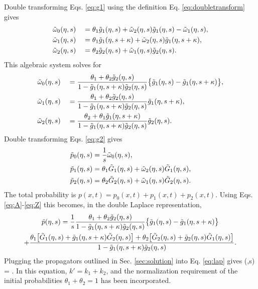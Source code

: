 Double transforming Eqs. \ref{eq:g1} using the definition Eq. \ref{eq:doubletransform} gives
\begin{alignat}{2}
	&\tilde{\omega}_{0}(\eta,s) &&= \theta_1 \tilde{g}_1(\eta,s) + \tilde{\omega}_2(\eta,s)\tilde{g}_1(\eta,s)-\tilde{\omega}_{1}(\eta,s),\\
	&\tilde{\omega}_{1}(\eta,s) &&= \theta_1\tilde{g}_1(\eta,s+\kappa) + \tilde{\omega}_2(\eta,s)\tilde{g}_1(\eta,s+\kappa),\\
	&\tilde{\omega}_2(\eta,s) &&= \theta_2 \tilde{g}_2(\eta,s) + \tilde{\omega}_{1}(\eta,s)\tilde{g}_2(\eta,s).
\end{alignat}
This algebraic system solves for 
\begin{alignat}{2}
	&\tilde{\omega}_{0}(\eta,s) &&= \frac{\theta_1 + \theta_2 \tilde{g}_2(\eta,s)}{1-\tilde{g}_1(\eta,s+\kappa)\tilde{g}_2(\eta,s)}\big\{\tilde{g}_1(\eta,s)-\tilde{g}_1(\eta,s+\kappa) \big\}, \label{eq:A} \\
	&\tilde{\omega}_{1}(\eta,s) &&= \frac{\theta_1 + \theta_2 \tilde{g}_2(\eta,s)}{1-\tilde{g}_1(\eta,s+\kappa)\tilde{g}_2(\eta,s)}\tilde{g}_1(\eta,s+\kappa),\\
	&\tilde{\omega}_{2}(\eta,s) &&= \frac{\theta_2 + \theta_1 \tilde{g}_1(\eta,s+\kappa)}{1-\tilde{g}_1(\eta,s+\kappa)\tilde{g}_2(\eta,s)}\tilde{g}_2(\eta,s). 
\end{alignat}
Double transforming Eqs. \ref{eq:g2} gives
\begin{align}
	\tilde{p}_0(\eta,s) &= \frac{1}{s}\tilde{\omega}_{0}(\eta,s),\\
	\tilde{p}_1(\eta,s) &= \theta_1 \tilde{G}_1(\eta,s) + \tilde{\omega}_2(\eta,s) \tilde{G}_1(\eta,s),\\
	\tilde{p}_2(\eta,s) &= \theta_2 \tilde{G}_2(\eta,s) + \tilde{\omega}_{1}(\eta,s)\tilde{G}_2(\eta,s).\label{eq:Z}
\end{align}
The total probability is $p(x,t) = p_0(x,t) + p_1(x,t) + p_2(x,t)$. Using Eqs. \ref{eq:A}-\ref{eq:Z} this becomes, in the double Laplace representation, 
\begin{multline}
	\tilde{p}(\eta,s) = \frac{1}{s}\frac{\theta_1 + \theta_2 \tilde{g}_2(\eta,s)}{1-\tilde{g}_1(\eta,s+\kappa)\tilde{g}_2(\eta,s)}\big\{\tilde{g}_1(\eta,s)-\tilde{g}_1(\eta,s+\kappa) \big\} \\
	+\frac{\theta_1\big[\tilde{G}_1(\eta,s) + \tilde{g}_1(\eta,s+\kappa)\tilde{G}_2(\eta,s)\big]+ \theta_2\big[\tilde{G}_2(\eta,s) + \tilde{g}_2(\eta,s)\tilde{G}_1(\eta,s)\big]}{1-\tilde{g}_1(\eta,s+\kappa)\tilde{g}_2(\eta,s)}. \\
	\label{eq:lap}
\end{multline}
Plugging the propagators outlined in Sec. \ref{sec:solution} into Eq. \ref{eq:lap} gives 
\be {}(\eta,s) = .\label{eq:nicedist}\ee
In this equation, $k'=k_1+k_2$, and the normalization requirement of the initial probabilities $\theta_1 + \theta_2 = 1$ has been incorporated.
